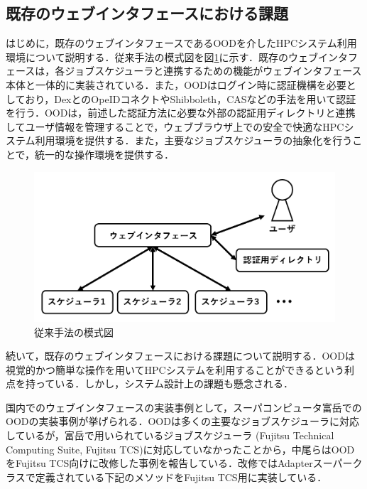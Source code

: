 \subsection{既存のウェブインタフェースにおける課題}
はじめに，既存のウェブインタフェースであるOODを介したHPCシステム利用環境について説明する．従来手法の模式図を図\ref{fig5}に示す．既存のウェブインタフェースは，各ジョブスケジューラと連携するための機能がウェブインタフェース本体と一体的に実装されている．また，OODはログイン時に認証機構を必要としており，DexとのOpeIDコネクト\cite{dex}\cite{openidconnect}やShibboleth\cite{shibboleth}，CAS\cite{CAS}などの手法を用いて認証を行う．OODは，前述した認証方法に必要な外部の認証用ディレクトリと連携してユーザ情報を管理することで，ウェブブラウザ上での安全で快適なHPCシステム利用環境を提供する．また，主要なジョブスケジューラの抽象化を行うことで，統一的な操作環境を提供する．\par

\begin{figure}[b]
    \centering
    \includegraphics[width=120mm]{./fig/conventional_method.png}
    \caption{従来手法の模式図}
    \label{fig5}
\end{figure}

続いて，既存のウェブインタフェースにおける課題について説明する．OODは視覚的かつ簡単な操作を用いてHPCシステムを利用することができるという利点を持っている．しかし，システム設計上の課題も懸念される．\par
国内でのウェブインタフェースの実装事例として，スーパコンピュータ富岳でのOODの実装事例が挙げられる．OODは多くの主要なジョブスケジューラに対応しているが，富岳で用いられているジョブスケジューラ (Fujitsu Technical Computing Suite, Fujitsu TCS)に対応していなかったことから，中尾らはOODをFujitsu TCS向けに改修した事例を報告している\cite{cite4}．改修ではAdapterスーパークラスで定義されている下記のメソッドをFujitsu TCS用に実装している．\par


